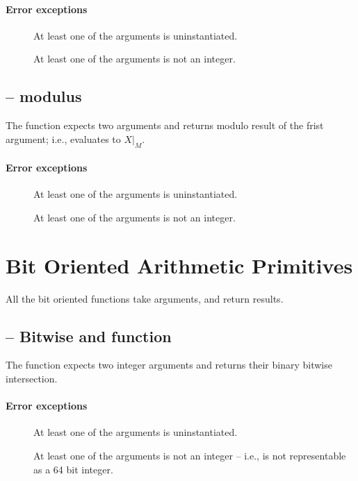 \paragraph{Error exceptions}
\begin{description}
\item[]
At least one of the arguments is uninstantiated.
\item[]
At least one of the arguments is not an integer.
\end{description}

\subsection{ -- modulus }
The  function expects two  arguments and returns modulo result of the frist argument; i.e.,  evaluates to $X|_M$.
        
\paragraph{Error exceptions}
\begin{description}
\item[]
At least one of the arguments is uninstantiated.
\item[]
At least one of the arguments is not an integer.
\end{description}

\section{Bit Oriented Arithmetic Primitives}
All the bit oriented functions take  arguments, and return  results.

\subsection{ -- Bitwise and function}
\label{arith:band}
The  function expects two integer arguments and returns their binary bitwise intersection.
        
\paragraph{Error exceptions}
\begin{description}
\item[]
At least one of the arguments is uninstantiated.
\item[]
At least one of the arguments is not an integer -- i.e., is not representable as a 64 bit integer.
\end{description}

